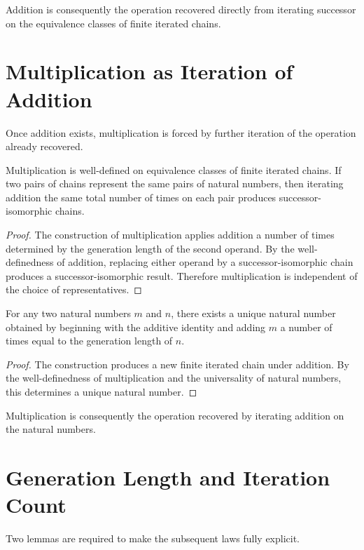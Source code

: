 \documentclass[12pt,anyside]{book}
\begin{document}
Addition is consequently the operation recovered directly from iterating successor on the equivalence classes of finite iterated chains.

\section{Multiplication as Iteration of Addition}
Once addition exists, multiplication is forced by further iteration of the operation already recovered.

\begin{theorem}
Multiplication is well-defined on equivalence classes of finite iterated chains. If two pairs of chains represent the same pairs of natural numbers, then iterating addition the same total number of times on each pair produces successor-isomorphic chains.
\end{theorem}

\begin{proof}
The construction of multiplication applies addition a number of times determined by the generation length of the second operand. By the well-definedness of addition, replacing either operand by a successor-isomorphic chain produces a successor-isomorphic result. Therefore multiplication is independent of the choice of representatives.
\end{proof}

\begin{theorem}
For any two natural numbers $m$ and $n$, there exists a unique natural number obtained by beginning with the additive identity and adding $m$ a number of times equal to the generation length of $n$.
\end{theorem}

\begin{proof}
The construction produces a new finite iterated chain under addition. By the well-definedness of multiplication and the universality of natural numbers, this determines a unique natural number.
\end{proof}

Multiplication is consequently the operation recovered by iterating addition on the natural numbers.

\section{Generation Length and Iteration Count}
Two lemmas are required to make the subsequent laws fully explicit.
\end{document}
